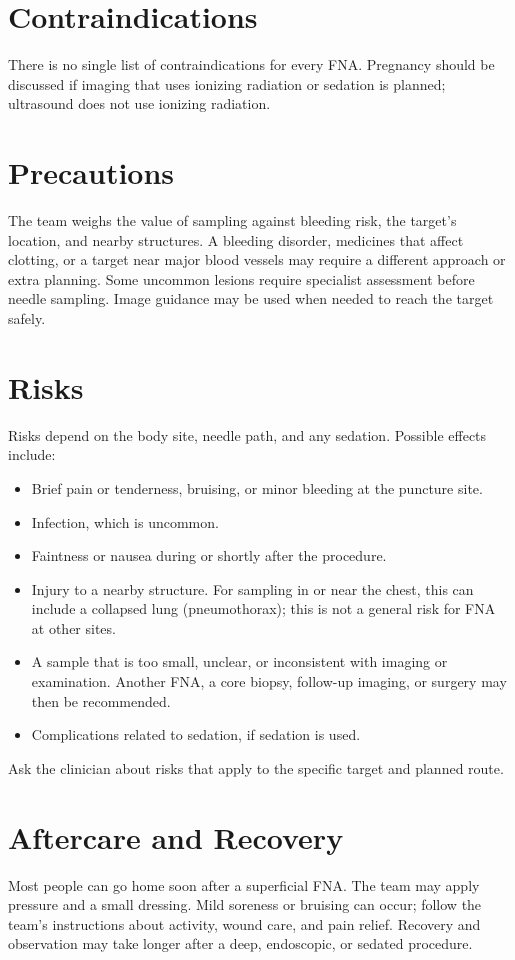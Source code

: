 \section*{Contraindications}
There is no single list of contraindications for every FNA. Pregnancy should be discussed if imaging that uses ionizing radiation or sedation is planned; ultrasound does not use ionizing radiation.

\section*{Precautions}
The team weighs the value of sampling against bleeding risk, the target's location, and nearby structures. A bleeding disorder, medicines that affect clotting, or a target near major blood vessels may require a different approach or extra planning. Some uncommon lesions require specialist assessment before needle sampling. Image guidance may be used when needed to reach the target safely.

\section*{Risks}
Risks depend on the body site, needle path, and any sedation. Possible effects include:
\begin{itemize}
    \item Brief pain or tenderness, bruising, or minor bleeding at the puncture site.
    \item Infection, which is uncommon.
    \item Faintness or nausea during or shortly after the procedure.
    \item Injury to a nearby structure. For sampling in or near the chest, this can include a collapsed lung (pneumothorax); this is not a general risk for FNA at other sites.
    \item A sample that is too small, unclear, or inconsistent with imaging or examination. Another FNA, a core biopsy, follow-up imaging, or surgery may then be recommended.
    \item Complications related to sedation, if sedation is used.
\end{itemize}
Ask the clinician about risks that apply to the specific target and planned route.

\section*{Aftercare and Recovery}
Most people can go home soon after a superficial FNA. The team may apply pressure and a small dressing. Mild soreness or bruising can occur; follow the team's instructions about activity, wound care, and pain relief. Recovery and observation may take longer after a deep, endoscopic, or sedated procedure.

